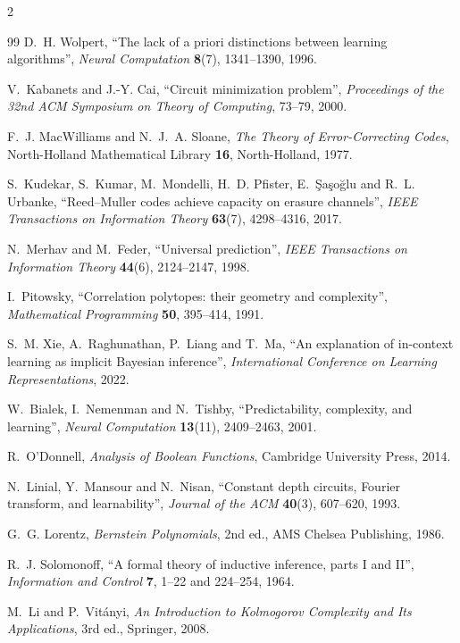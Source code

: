 \documentclass[11pt]{article}
\begin{document}
\begin{multicols}{2}
\begin{thebibliography}{99}
D.~H. Wolpert,
``The lack of a priori distinctions between learning algorithms'',
\emph{Neural Computation} \textbf{8}(7), 1341--1390, 1996.

V.~Kabanets and J.-Y. Cai,
``Circuit minimization problem'',
\emph{Proceedings of the 32nd ACM Symposium on Theory of Computing},
73--79, 2000.

F.~J. MacWilliams and N.~J.~A. Sloane,
\emph{The Theory of Error-Correcting Codes},
North-Holland Mathematical Library \textbf{16}, North-Holland, 1977.

S.~Kudekar, S.~Kumar, M.~Mondelli, H.~D. Pfister, E.~\c{S}a\c{s}o\u{g}lu
and R.~L. Urbanke,
``Reed--Muller codes achieve capacity on erasure channels'',
\emph{IEEE Transactions on Information Theory} \textbf{63}(7),
4298--4316, 2017.

N.~Merhav and M.~Feder,
``Universal prediction'',
\emph{IEEE Transactions on Information Theory} \textbf{44}(6),
2124--2147, 1998.

I.~Pitowsky,
``Correlation polytopes: their geometry and complexity'',
\emph{Mathematical Programming} \textbf{50}, 395--414, 1991.

S.~M. Xie, A.~Raghunathan, P.~Liang and T.~Ma,
``An explanation of in-context learning as implicit Bayesian inference'',
\emph{International Conference on Learning Representations}, 2022.

W.~Bialek, I.~Nemenman and N.~Tishby,
``Predictability, complexity, and learning'',
\emph{Neural Computation} \textbf{13}(11), 2409--2463, 2001.

R.~O'Donnell,
\emph{Analysis of Boolean Functions},
Cambridge University Press, 2014.

N.~Linial, Y.~Mansour and N.~Nisan,
``Constant depth circuits, Fourier transform, and learnability'',
\emph{Journal of the ACM} \textbf{40}(3), 607--620, 1993.

G.~G. Lorentz,
\emph{Bernstein Polynomials}, 2nd ed.,
AMS Chelsea Publishing, 1986.

R.~J. Solomonoff,
``A formal theory of inductive inference, parts I and II'',
\emph{Information and Control} \textbf{7}, 1--22 and 224--254, 1964.

M.~Li and P.~Vit\'anyi,
\emph{An Introduction to Kolmogorov Complexity and Its Applications},
3rd ed., Springer, 2008.


\end{thebibliography}
\end{multicols}
\end{document}
